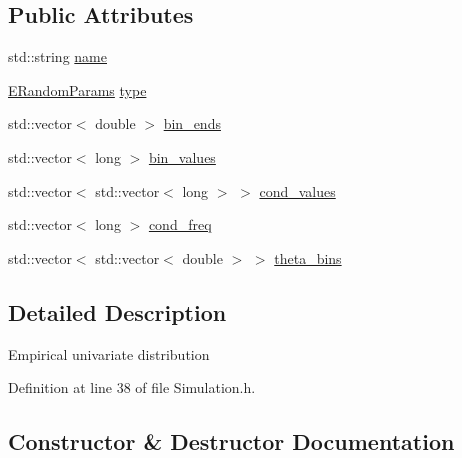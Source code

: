 \subsection*{Public Attributes}
\begin{DoxyCompactItemize}
\item 
std\+::string \hyperlink{classsolar__core_1_1tools_1_1_empirical_u_v_d_a4f2500cdf861542aa18c417564f43762}{name}
\item 
\hyperlink{namespacesolar__core_a1a8e58483c0cf418bd680fc3a0ca8222}{E\+Random\+Params} \hyperlink{classsolar__core_1_1tools_1_1_empirical_u_v_d_a581e5c7f2116d67f5a250725624ff908}{type}
\item 
std\+::vector$<$ double $>$ \hyperlink{classsolar__core_1_1tools_1_1_empirical_u_v_d_aa0a0775b7b188d292a98e91c3bd8a1b5}{bin\+\_\+ends}
\item 
std\+::vector$<$ long $>$ \hyperlink{classsolar__core_1_1tools_1_1_empirical_u_v_d_a88761616541a12ec55dc74fea5613377}{bin\+\_\+values}
\item 
std\+::vector$<$ std\+::vector$<$ long $>$ $>$ \hyperlink{classsolar__core_1_1tools_1_1_empirical_u_v_d_a51ef33f87ed7836a5239c39e8466efc6}{cond\+\_\+values}
\item 
std\+::vector$<$ long $>$ \hyperlink{classsolar__core_1_1tools_1_1_empirical_u_v_d_a19135ba9bf7bb2c5c5819964e6149b2c}{cond\+\_\+freq}
\item 
std\+::vector$<$ std\+::vector$<$ double $>$ $>$ \hyperlink{classsolar__core_1_1tools_1_1_empirical_u_v_d_aa5c9e49cc6e7b7788f9f14256a83d76f}{theta\+\_\+bins}
\end{DoxyCompactItemize}


\subsection{Detailed Description}
Empirical univariate distribution 

Definition at line 38 of file Simulation.\+h.



\subsection{Constructor \& Destructor Documentation}
\hypertarget{classsolar__core_1_1tools_1_1_empirical_u_v_d_a3745b987a8d7c7e61d2aabbaf652a3e5}{}
